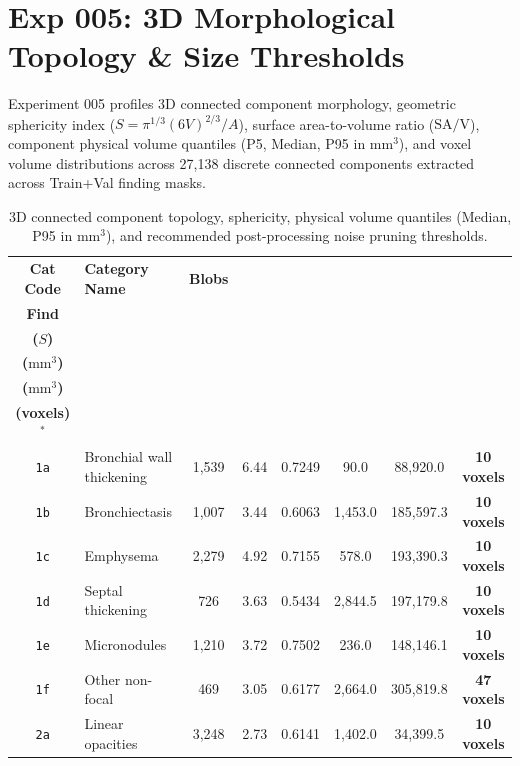 \documentclass[11pt,a4paper]{article}
\begin{document}
\section{Exp 005: 3D Morphological Topology \& Size Thresholds}

Experiment 005 profiles 3D connected component morphology, geometric sphericity index ($S = \pi^{1/3}(6V)^{2/3} / A$), surface area-to-volume ratio ($\text{SA}/\text{V}$), component physical volume quantiles (P5, Median, P95 in $\text{mm}^3$), and voxel volume distributions across 27,138 discrete connected components extracted across Train+Val finding masks.

\begin{table}[htbp]
\centering
\caption{3D connected component topology, sphericity, physical volume quantiles (Median, P95 in $\text{mm}^3$), and recommended post-processing noise pruning thresholds.}
\label{tab:morphology_stats}
\scriptsize
\setlength{\tabcolsep}{2.2pt}
\begin{tabularx}{\linewidth}{c >{\raggedright\arraybackslash}X c c c c c c}
\toprule
\textbf{Cat Code} & \textbf{Category Name} & \textbf{Blobs} & \makecell{\textbf{Blobs/}\\\textbf{Find}} & \makecell{\textbf{Sphericity}\\\textbf{($S$)}} & \makecell{\textbf{Median Vol}\\\textbf{($\text{mm}^3$)}} & \makecell{\textbf{P95 Vol}\\\textbf{($\text{mm}^3$)}} & \makecell{\textbf{Rec Min Size}\\\textbf{(voxels)}$^*$} \\
\midrule
\texttt{1a} & Bronchial wall thickening & 1,539 & 6.44 & 0.7249 & 90.0 & 88,920.0 & \textbf{10 voxels} \\
\texttt{1b} & Bronchiectasis & 1,007 & 3.44 & 0.6063 & 1,453.0 & 185,597.3 & \textbf{10 voxels} \\
\texttt{1c} & Emphysema & 2,279 & 4.92 & 0.7155 & 578.0 & 193,390.3 & \textbf{10 voxels} \\
\texttt{1d} & Septal thickening & 726 & 3.63 & 0.5434 & 2,844.5 & 197,179.8 & \textbf{10 voxels} \\
\texttt{1e} & Micronodules & 1,210 & 3.72 & 0.7502 & 236.0 & 148,146.1 & \textbf{10 voxels} \\
\texttt{1f} & Other non-focal & 469 & 3.05 & 0.6177 & 2,664.0 & 305,819.8 & \textbf{47 voxels} \\
\texttt{2a} & Linear opacities & 3,248 & 2.73 & 0.6141 & 1,402.0 & 34,399.5 & \textbf{10 voxels} \\

\end{tabularx}
\end{table}
\end{document}
